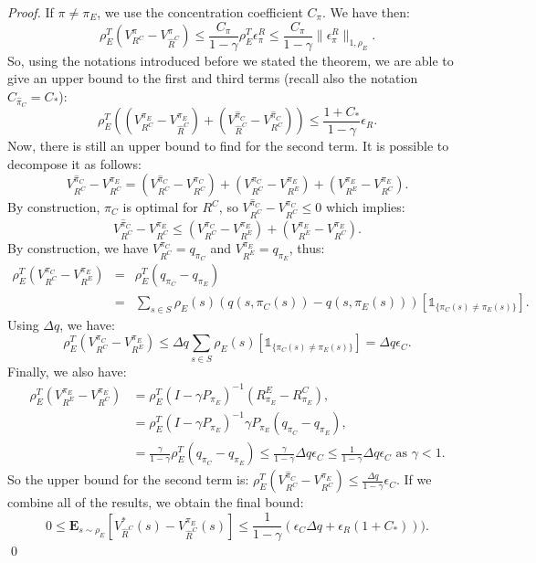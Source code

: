 \documentclass[smallextended]{svjour3}
\newcommand{\E}{\mathbf{E}}
\begin{document}
\begin{proof}
If $\pi\neq\pi_E$, we use the concentration coefficient $C_\pi$. We have then:
\begin{equation}
  \rho_E^T(V^{\pi}_{R^C}-V^{\pi}_{\hat{R}^C})\leq\frac{C_\pi}{1-\gamma}\rho_E^T\epsilon^R_{\pi}\leq\frac{C_\pi}{1-\gamma}\|\epsilon^R_{\pi}\|_{1,\rho_E}.
  \end{equation}
So, using the notations introduced before we stated the theorem, we are able to give an upper bound to the first and third terms (recall also the notation $C_{\hat \pi_C} = C_*$):
\begin{equation}
\rho_E^T((V^{\pi_E}_{R^C}-V^{\pi_E}_{\hat{R}^C})+(V^{\hat{\pi}_C}_{\hat{R}^C}-V^{\hat{\pi}_C}_{R^C}))\leq\frac{1+C_*}{1-\gamma}\epsilon_R.
\end{equation}
Now, there is still an upper bound to find for the second term. It is possible to decompose it as follows:
\begin{equation}
V^{\hat{\pi}_C}_{R^C}-V^{\pi_E}_{R^C}=(V^{\hat{\pi}_C}_{R^C}-V^{\pi_C}_{R^C})+(V^{\pi_C}_{R^C}-V^{\pi_E}_{R^E})+(V^{\pi_E}_{R^E}-V^{\pi_E}_{R^C}).
\end{equation}
By construction, $\pi_C$ is optimal for $R^C$, so $V^{\hat{\pi}_C}_{R^C}-V^{\pi_C}_{R^C}\leq0$ which implies:
\begin{equation}
V^{\hat{\pi}_C}_{R^C}-V^{\pi_E}_{R^C}\leq(V^{\pi_C}_{R^C}-V^{\pi_E}_{R^E})+(V^{\pi_E}_{R^E}-V^{\pi_E}_{R^C}).
\end{equation}
By construction, we have $V^{\pi_C}_{R^C}=q_{\pi_C}$ and $V^{\pi_E}_{R^E}=q_{\pi_E}$, thus:
\begin{eqnarray}
\rho_E^T(V^{\pi_C}_{R^C}-V^{\pi_E}_{R^E})&=&\rho_E^T(q_{\pi_C}-q_{\pi_E})\\
&=&\sum_{s\in S}\rho_E(s)(q(s,\pi_C(s))-q(s,\pi_E(s)))[\mathds{1}_{\{\pi_C(s)\neq\pi_E(s)\}}].
\end{eqnarray}
Using $\Delta q$, we have:
\begin{equation}
\rho_E^T(V^{\pi_C}_{R^C}-V^{\pi_E}_{R^E})\leq\Delta q\sum_{s\in S}\rho_E(s)[\mathds{1}_{\{\pi_C(s)\neq\pi_E(s)\}}]= \Delta q \epsilon_C.
\end{equation}
Finally, we also have:
\begin{align}
\rho_E^T(V^{\pi_E}_{R^E}-V^{\pi_E}_{R^C})&=\rho_E^T(I-\gamma P_{\pi_E})^{-1}(R^E_{\pi_E}-R^C_{\pi_E}),
\\
&=\rho_E^T(I-\gamma P_{\pi_E})^{-1}\gamma P_{\pi_E}(q_{\pi_C}-q_{\pi_E}),
\\
&=\frac{\gamma}{1-\gamma}\rho_E^T(q_{\pi_C}-q_{\pi_E})\leq \frac{\gamma}{1-\gamma}\Delta q \epsilon_C \leq  \frac{1}{1-\gamma}\Delta q \epsilon_C\textrm{ as }\gamma<1.
\end{align}
So the upper bound for the second term is: $\rho_E^T(V^{\hat{\pi}_C}_{R^C}-V^{\pi_E}_{R^C})\leq \frac{\Delta q}{1-\gamma}\epsilon_C$.
If we combine all of the results, we obtain the final bound:
\begin{equation}
0\leq\E_{s\sim\rho_E}[V^*_{\hat{R}^C}(s)-V^{\pi_E}_{\hat{R}^C}(s)]\leq \frac{1}{1-\gamma}(\epsilon_C\Delta q +\epsilon_R(1+C_*))).
\end{equation}
\qed
\end{proof}
\end{document}
